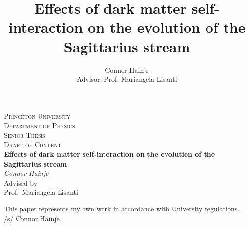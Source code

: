 \documentclass{report}
\title{Effects of dark matter self-interaction on the evolution of the Sagittarius stream}
\author{Connor Hainje\\Advisor: Prof. Mariangela Lisanti}
\date{ }
\begin{document}

\begin{titlepage}
    \centering
    \vspace*{1in}
    {\scshape\Large Princeton University} \\
    {\scshape\large Department of Physics} \\
    \vspace{5mm}
    {\scshape\Large Senior Thesis} \\
    \vspace{2mm}
    {\scshape\Large Draft of Content} \\
    \vspace{24mm}
    {\Large\bfseries Effects of dark matter self-interaction on the evolution of
    the Sagittarius stream} \\
    \vspace{8mm}
    {\large \itshape Connor Hainje} \\
    \vspace{16mm}
    Advised by \\
    Prof.~Mariangela Lisanti \par
    \vfill
    This paper represents my own work in accordance with University regulations. \\
    /s/ Connor Hainje
    \vspace{20mm}
  \end{titlepage}
  


\tableofcontents




% 
% 





\end{document}
